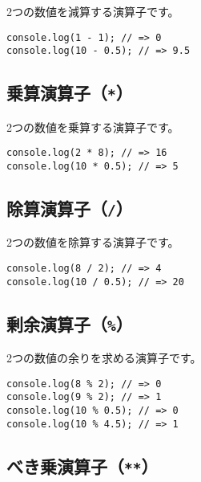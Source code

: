 2つの数値を減算する演算子です。

\begin{lstlisting}
console.log(1 - 1); // => 0
console.log(10 - 0.5); // => 9.5
\end{lstlisting}

\hypertarget{multiplication-operator}{%
\subsection{\texorpdfstring{乗算演算子（\texttt{*}）}{乗算演算子（*）}}\label{multiplication-operator}}

2つの数値を乗算する演算子です。

\begin{lstlisting}
console.log(2 * 8); // => 16
console.log(10 * 0.5); // => 5
\end{lstlisting}

\hypertarget{division-operator}{%
\subsection{\texorpdfstring{除算演算子（\texttt{/}）}{除算演算子（/）}}\label{division-operator}}

2つの数値を除算する演算子です。

\begin{lstlisting}
console.log(8 / 2); // => 4
console.log(10 / 0.5); // => 20
\end{lstlisting}

\hypertarget{modulus-operator}{%
\subsection{\texorpdfstring{剰余演算子（\texttt{\%}）}{剰余演算子（\%）}}\label{modulus-operator}}

2つの数値の余りを求める演算子です。

\begin{lstlisting}
console.log(8 % 2); // => 0
console.log(9 % 2); // => 1
console.log(10 % 0.5); // => 0
console.log(10 % 4.5); // => 1
\end{lstlisting}

\hypertarget{pow-operator}{%
\subsection[べき乗演算子（\texttt{**}）]{べき乗演算子（\texttt{**}）\protect{}}\label{pow-operator}}

